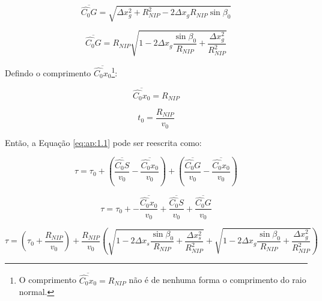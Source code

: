 \begin{equation}
 \label{eq:ap:1.18}
 \overline{\hat{C_0}G} = \sqrt{ \Delta x_{g}^2 + R_{NIP}^2 - 2 \Delta x_g R_{NIP} \sin{\beta_0} }
\end{equation}

\begin{equation}
 \label{eq:ap:1.19}
 \overline{\hat{C_0}G} = 
 R_{NIP} \sqrt{  1 - 2 \Delta x_g \frac{\sin{\beta_0}}{R_{NIP}} + \frac{\Delta x_{g}^2}{R_{NIP}^2} }
\end{equation}

Defindo o comprimento $\overline{\hat{C_0}x_0}$\footnote{O comprimento
$\overline{\hat{C_0}x_0} = R_{NIP}$ não é de nenhuma forma o comprimento do raio normal.}:

\begin{equation}
 \label{eq:ap:1.20}
 \overline{\hat{C_0}x_0} = R_{NIP}
\end{equation}

\begin{equation}
 \label{eq:ap:1.21}
t_0 = \frac{R_{NIP}}{v_0}
\end{equation}

Então, a Equação \ref{eq:ap:1.1} pode ser reescrita como:

\begin{equation}
 \label{eq:ap:1.22}
\tau = \tau_0 + \left( \frac{\overline{\hat{C_0}S}}{v_0} - \frac{\overline{\hat{C_0}x_0}}{v_0} \right)
+ \left( \frac{\overline{\hat{C_0}G}}{v_0} - \frac{\overline{\hat{C_0}x_0}}{v_0} \right)
\end{equation}

\begin{equation}
 \label{eq:ap:1.23}
\tau = \tau_0 + - \frac{\overline{\hat{C_0}x_0}}{v_0} + \frac{\overline{\hat{C_0}S}}{v_0}
+ \frac{\overline{\hat{C_0}G}}{v_0}
\end{equation}

\begin{equation}
 \label{eq:ap:1.24}
\tau = \left( \tau_0 + \frac{R_{NIP}}{v_0} \right)
+ \frac{R_{NIP}}{v_0} \left( \sqrt{  1 - 2 \Delta x_s \frac{\sin{\beta_0}}{R_{NIP}} + \frac{\Delta x_{s}^2}{R_{NIP}^2} }
+ \sqrt{  1 - 2 \Delta x_g \frac{\sin{\beta_0}}{R_{NIP}} + \frac{\Delta x_{g}^2}{R_{NIP}^2} } \right)
\end{equation}
